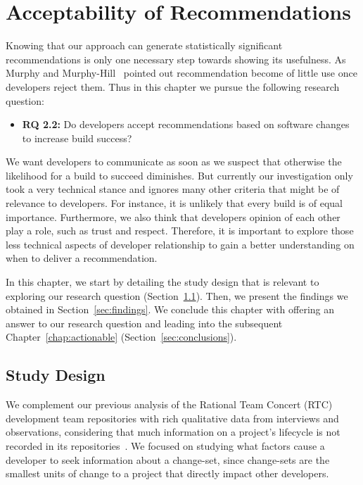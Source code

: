 \section{Acceptability of Recommendations}
\label{chap:talk}
Knowing that our approach can generate statistically significant recommendations is only one necessary step towards showing its usefulness.
As Murphy and Murphy-Hill~\cite{murphy:rsse:2010} pointed out recommendation become of little use once developers reject them.
Thus in this chapter we pursue the following research question:

\begin{itemize}
  \item\textbf{RQ 2.2:} Do developers accept recommendations based on software changes to increase build success? 
\end{itemize}

We want developers to communicate as soon as we suspect that otherwise the likelihood for a build to succeed diminishes.
But currently our investigation only took a very technical stance and ignores many other criteria that might be of relevance to developers.
For instance, it is unlikely that every build is of equal importance.
Furthermore, we also think that developers opinion of each other play a role, such as trust and respect.
Therefore, it is important to explore those less technical aspects of developer relationship to gain a better understanding on when to deliver a recommendation.

In this chapter, we start by detailing the study design that is relevant to exploring our research question (Section~\ref{sec:studydesign}).
Then, we present the findings we obtained in Section~\ref{sec:findings}.
We conclude this chapter with offering an answer to our research question and leading into the subsequent Chapter~\ref{chap:actionable} (Section~\ref{sec:conclusions}).


\subsection{Study Design}
\label{sec:studydesign}
We complement our previous analysis of the Rational Team Concert (RTC) development team repositories with rich qualitative data from interviews and observations, considering that much information on a project's lifecycle is not recorded in its repositories~\cite{aranda:icse:2009}. We focused on studying what factors cause a developer to seek information about a change-set, since change-sets are the smallest units of change to a project that directly impact other developers.

